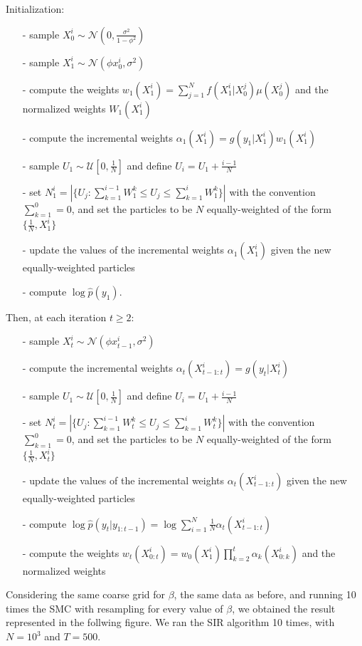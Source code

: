 \documentclass[]{article}
\begin{document}
	Initialization:
	\begin{enumerate}
		\item[-] sample $X_0^i \sim \mathcal{N}(0, \frac{\sigma^2}{1-\phi^2})$
		\item[-] sample $X_1^i \sim \mathcal{N}(\phi x_0^i,\sigma^2) $ 
		\item[-] compute the weights $w_1(X_1^i) = \sum_{j=1}^{N}f(X_1^i|X_0^j)\mu(X_0^j)$ and the normalized weights $W_1(X_1^i)$
		\item[-] compute the incremental weights $ \alpha_1(X_1^i) = g(y_1|X_1^i)w_1(X_1^i) $
		\item[-] sample $U_1 \sim \mathcal{U}[0, \frac{1}{N}]$ and define $U_i = U_1 + \frac{i-1}{N}$
		\item[-] set $N_1^i = |\{ U_j: \sum_{k=1}^{i-1}W_1^k \leq U_j \leq \sum_{k=1}^{i}W_1^k \}|$ with the convention $\sum_{k=1}^{0}=0$, and set the particles to be $N$ equally-weighted of the form $\{\frac{1}{N}, X_1^i\}$
		\item[-] update the values of the incremental weights  $ \alpha_1(X_1^i) $ given the new equally-weighted particles
		\item[-] compute $\log \hat{p}(y_1)$. 
	\end{enumerate}
	Then, at each iteration $t \geq 2$:
	\begin{enumerate}
		\item[-] sample $X_t^i \sim \mathcal{N}(\phi x_{t-1}^i,\sigma^2) $
		\item[-] compute the incremental weights $ \alpha_t(X_{t-1:t}^i) = g(y_t|X_t^i) $
		\item[-] sample $U_1 \sim \mathcal{U}[0, \frac{1}{N}]$ and define $U_i = U_1 + \frac{i-1}{N}$
		\item[-] set $N_t^i = |\{ U_j: \sum_{k=1}^{i-1}W_t^k \leq U_j \leq \sum_{k=1}^{i}W_t^k \}|$ with the convention $\sum_{k=1}^{0}=0$, and set the particles to be $N$ equally-weighted of the form $\{\frac{1}{N}, X_t^i\}$
		\item[-] update the values of the incremental weights  $ \alpha_t(X_{t-1:t}^i) $ given the new equally-weighted particles
		\item[-] compute $\log \hat{p}(y_t|y_{1:t-1})=\log\sum_{i=1}^{N}\frac{1}{N}\alpha_t(X_{t-1:t}^i)$
		\item[-] compute the weights $
		w_t(X_{0:t}^i)=w_0(X_1^i)\prod_{k=2}^{t}\alpha_k(X_{0:k}^i)$ and the normalized weights
	\end{enumerate}
	Considering the same coarse grid for $\beta$, the same data as before, and running 10 times the SMC with resampling for every value of $\beta$, we obtained the result represented in the follwing figure. We ran the SIR algorithm 10 times,  with $N=10^3$ and $T=500$.
\end{document}
